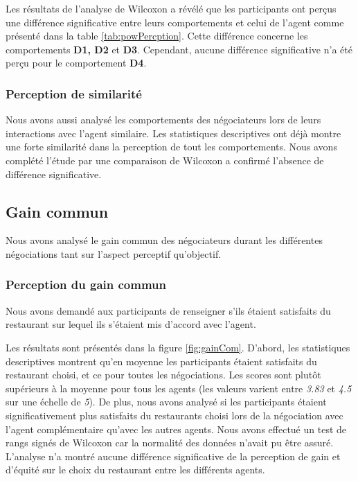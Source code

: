 		Les résultats de l'analyse de Wilcoxon a révélé que les participants ont perçus une différence significative entre leurs comportements et celui de l'agent comme présenté dans la table \ref{tab:powPercption}. Cette différence concerne les comportements \textbf{D1, D2} et \textbf{D3}. Cependant, aucune différence significative n'a été perçu pour le comportement \textbf{D4}. 
			
			
	\subsubsection{Perception de similarité}
		Nous avons aussi analysé les comportements des négociateurs lors de leurs interactions avec l'agent similaire. Les statistiques descriptives ont déjà montre une forte similarité dans la perception de tout les comportements. Nous avons complété l'étude par une comparaison de Wilcoxon a confirmé l'absence de différence significative.  
	
	\subsection{Gain commun}
		Nous avons analysé le gain commun des négociateurs durant les différentes négociations tant sur l'aspect perceptif qu'objectif.
		
		\subsubsection{Perception du gain commun} Nous avons demandé aux participants de renseigner s'ils étaient satisfaits du restaurant sur lequel ils s'étaient mis d'accord avec l'agent.
		 
		Les résultats sont présentés dans la figure \ref{fig:gainCom}. D'abord, les statistiques descriptives montrent qu'en moyenne les participants étaient satisfaits du restaurant choisi, et ce pour toutes les négociations. Les scores sont plutôt supérieurs à la moyenne pour tous les agents (les valeurs varient entre \emph{3.83} et \emph{4.5} sur une échelle de \emph{5}). De plus, nous avons analysé si les participants étaient significativement plus satisfaits du restaurants choisi lors de la négociation avec l'agent complémentaire qu'avec les autres agents. Nous avons effectué un test de rangs signés de Wilcoxon car la normalité des données n'avait pu être assuré. L'analyse n'a montré aucune différence significative de la perception de gain et d'équité sur le choix du restaurant entre les différents agents. 
		
